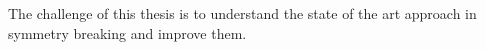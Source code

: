 The challenge of this thesis is to understand the state of  the art approach in symmetry breaking and
improve them.
%
%
%
%
%
%


%
%
% 
% 
%
%
%
%
% 
